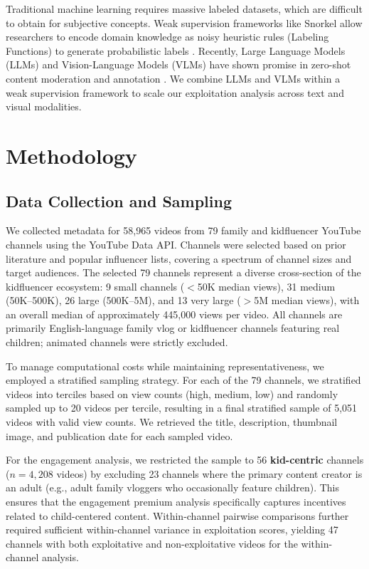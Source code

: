 \documentclass[letterpaper]{article} %
\begin{document}
Traditional machine learning requires massive labeled datasets, which are difficult to obtain for subjective concepts. Weak supervision frameworks like Snorkel \citep{ratner2017snorkel,ratner2016data,bach2019snorkel} allow researchers to encode domain knowledge as noisy heuristic rules (Labeling Functions) to generate probabilistic labels \citep{johnson2022survey}. Recently, Large Language Models (LLMs) and Vision-Language Models (VLMs) have shown promise in zero-shot content moderation and annotation \citep{ma2023adapting,gilardi2023chatgpt,tornberg2024chatgpt}. We combine LLMs and VLMs within a weak supervision framework to scale our exploitation analysis across text and visual modalities.

\section{Methodology}

\subsection{Data Collection and Sampling}

We collected metadata for 58,965 videos from 79 family and kidfluencer YouTube channels using the YouTube Data API. Channels were selected based on prior literature and popular influencer lists, covering a spectrum of channel sizes and target audiences. The selected 79 channels represent a diverse cross-section of the kidfluencer ecosystem: 9 small channels ($<$50K median views), 31 medium (50K--500K), 26 large (500K--5M), and 13 very large ($>$5M median views), with an overall median of approximately 445,000 views per video. All channels are primarily English-language family vlog or kidfluencer channels featuring real children; animated channels were strictly excluded.

To manage computational costs while maintaining representativeness, we employed a stratified sampling strategy. For each of the 79 channels, we stratified videos into terciles based on view counts (high, medium, low) and randomly sampled up to 20 videos per tercile, resulting in a final stratified sample of 5,051 videos with valid view counts. We retrieved the title, description, thumbnail image, and publication date for each sampled video.

For the engagement analysis, we restricted the sample to 56 \textbf{kid-centric} channels ($n=4{,}208$ videos) by excluding 23 channels where the primary content creator is an adult (e.g., adult family vloggers who occasionally feature children). This ensures that the engagement premium analysis specifically captures incentives related to child-centered content. Within-channel pairwise comparisons further required sufficient within-channel variance in exploitation scores, yielding 47 channels with both exploitative and non-exploitative videos for the within-channel analysis.
\end{document}
